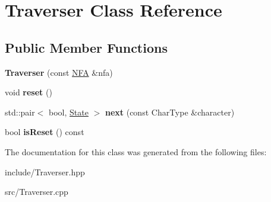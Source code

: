 \hypertarget{classTraverser}{}\section{Traverser Class Reference}
\label{classTraverser}
\subsection*{Public Member Functions}
\begin{DoxyCompactItemize}
\item 
{\bfseries Traverser} (const \hyperlink{classNFA}{N\+FA} \&nfa)\hypertarget{classTraverser_a10f9671d521e042be51ba680c075f245}{}\label{classTraverser_a10f9671d521e042be51ba680c075f245}

\item 
void {\bfseries reset} ()\hypertarget{classTraverser_a91be570afd17c4378cdcbc834c7b9670}{}\label{classTraverser_a91be570afd17c4378cdcbc834c7b9670}

\item 
std\+::pair$<$ bool, \hyperlink{structState}{State} $>$ {\bfseries next} (const Char\+Type \&character)\hypertarget{classTraverser_a5c215175cf4acf4d91fb252fb649ce5e}{}\label{classTraverser_a5c215175cf4acf4d91fb252fb649ce5e}

\item 
bool {\bfseries is\+Reset} () const \hypertarget{classTraverser_a18c4dd641ec393d47080e35bade34830}{}\label{classTraverser_a18c4dd641ec393d47080e35bade34830}

\end{DoxyCompactItemize}


The documentation for this class was generated from the following files\+:\begin{DoxyCompactItemize}
\item 
include/Traverser.\+hpp\item 
src/Traverser.\+cpp\end{DoxyCompactItemize}

